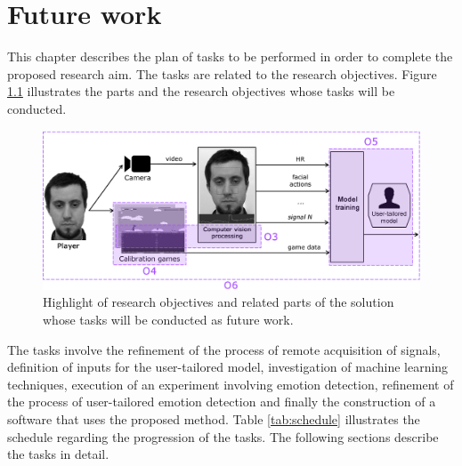 \chapter{Future work}
\label{ch:closing}

This chapter describes the plan of tasks to be performed in order to complete the proposed research aim. The tasks are related to the research objectives. Figure \ref{fig:future-work-objectives} illustrates the parts and the research objectives whose tasks will be conducted.

\begin{figure}[h]
    \centering
    \includegraphics[width=\textwidth]{figures/future-work-objectives.png}
    \caption{Highlight of research objectives and related parts of the solution whose tasks will be conducted as future work.}
    \label{fig:future-work-objectives}
\end{figure}

The tasks involve the refinement of the process of remote acquisition of signals, definition of inputs for the user-tailored model, investigation of machine learning techniques, execution of an experiment involving emotion detection, refinement of the process of user-tailored emotion detection and finally the construction of a software that uses the proposed method. Table \ref{tab:schedule} illustrates the schedule regarding the progression of the tasks. The following sections describe the tasks in detail.

